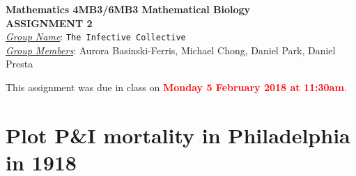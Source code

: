 \documentclass[12pt]{article}\usepackage[]{graphicx}\usepackage[]{color}
\begin{document}

\begin{center}
{\bf Mathematics 4MB3/6MB3 Mathematical Biology\\
 ASSIGNMENT 2}\\
\medskip
\underline{\emph{Group Name}}: \texttt{{\color{blue}The Infective Collective}}\\
\medskip
\underline{\emph{Group Members}}: {\color{blue}Aurora Basinski-Ferris, Michael Chong, Daniel Park, Daniel Presta}
\end{center}

\bigskip
\noindent
This assignment was due in class on \textcolor{red}{\bf Monday 5 February 2018 at 11:30am}.

\section{Plot P\&I mortality in Philadelphia in 1918}
\end{document}
